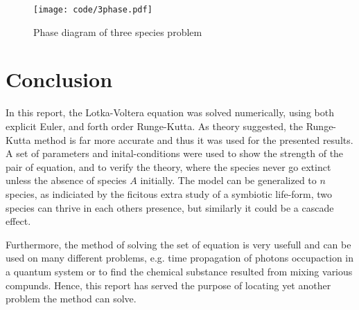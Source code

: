 \documentclass[a4paper]{article}
\newcommand{\newparagraph}{\vspace{.5cm}\noindent}
\begin{document}
\begin{figure}[H]
    \centering
    \texttt{[image: code/3phase.pdf]}
    \caption{Phase diagram of three species problem}
    \label{fig: 3phase}
\end{figure}

\newpage
\section{Conclusion}
In this report, the Lotka-Voltera equation was solved numerically, using both explicit Euler, and forth order Runge-Kutta. As theory suggested, the Runge-Kutta method is far more accurate and thus it was used for the presented results. A set of parameters and inital-conditions were used to show the strength of the pair of equation, and to verify the theory, where the species never go extinct unless the absence of species $A$ initially.
The model can be generalized to $n$ species, as indiciated by the ficitous extra study of a symbiotic life-form, two species can thrive in each others presence, but similarly it could be a cascade effect. 

\newparagraph
Furthermore, the method of solving the set of equation is very usefull and can be used on many different problems, e.g. time propagation of photons occupaction in a quantum system or to find the chemical substance resulted from mixing various compunds. Hence, this report has served the purpose of locating yet another problem the method can solve.
\end{document}
